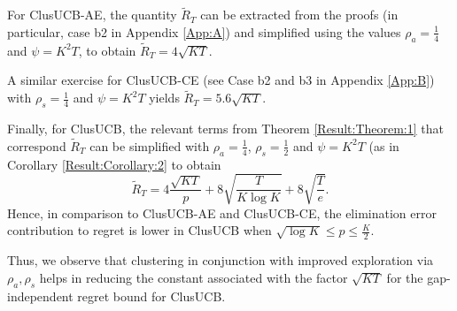 For ClusUCB-AE, the quantity $\tilde R_T$ can be extracted from the proofs (in particular, case b2 in Appendix \ref{App:A}) 
and simplified using the values $\rho_{a}=\frac{1}{4}$ and $\psi=K^{2}T$, to obtain $\tilde R_T = 4\sqrt{KT}$. 

A similar exercise for ClusUCB-CE (see Case b2 and b3 in Appendix \ref{App:B}) 
with $\rho_{s}=\frac{1}{4}$ and $\psi=K^{2}T$ yields $\tilde R_T = 5.6\sqrt{KT}$. 

Finally, for ClusUCB, the relevant terms from Theorem \ref{Result:Theorem:1} that correspond $\tilde R_T$ 
can be simplified with $\rho_{a}=\frac{1}{4}$, $\rho_{s}=\frac{1}{2}$ and $\psi=K^{2}T$ (as in Corollary \ref{Result:Corollary:2} to obtain  
$$\tilde R_T = 4\dfrac{\sqrt{KT}}{p} + 8\sqrt{\dfrac{T}{K\log K}} + 8\sqrt{\dfrac{T}{e}}.$$ 
Hence, in comparison to ClusUCB-AE and ClusUCB-CE, the elimination error contribution to regret is lower in ClusUCB when $\sqrt{\log K}\leq p\leq \frac{K}{2}$. 
 
Thus, we observe that clustering in conjunction with improved exploration via $\rho_{a},\rho_{s}$ helps in reducing the constant associated with the factor $\sqrt{KT}$ for the gap-independent regret bound for ClusUCB.
